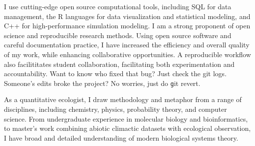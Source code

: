 \documentclass[12pt]{article}
\begin{document}
I use cutting-edge open source computational tools, including 
SQL for data management, the R languages for data visualization
and statistical modeling, and C++ for high-performance simulation
modeling. I am a strong proponent of open science and reproducible 
research methods. Using open source software
and careful documentation practice, I have increased the efficiency 
and overall quality of my work, while enhancing collaborative 
opportunities. A reproducible workflow also facilititates student 
collaboration, facilitating both experimentation and 
accountability. 
Want to know who fixed that bug? Just check the git logs. 
Someone's edits broke the project? No worries, just do 
{\texttt git revert}.

As a quantitative ecologist, I draw 
methodology and metaphor from a range of disciplines, including 
chemistry, physics, probability theory, and computer science.
From undergraduate experience in molecular biology and 
bioinformatics, to master's work combining abiotic 
climactic datasets with ecological observation, I have broad
and detailed understanding of modern biological systems 
theory.



\end{document}
